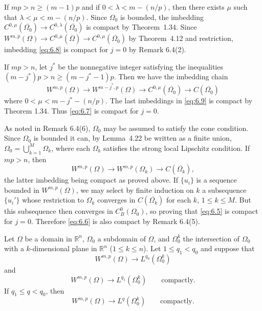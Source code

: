 \begin{para}
  If $mp > n\geq (m-1)p$ and if $0 < \lambda < m-(n/p)$, then there exists $\mu$ such that
  $\lambda < \mu < m-(n/p)$. Since $\Omega_0$ is bounded,
  the imbedding $C^{0,\mu}(\overline{\Omega_0})\to C^{0,\lambda}(\overline{\Omega_0})$ is compact by Theorem~1.34.
  Since $W^{m,p}(\Omega)\to C^{0,\mu}(\overline{\Omega})\to C^{0,\mu}(\overline{\Omega_0})$ by Theorem~4.12
  and restriction, imbedding \eqref{eq:6.8} is compact for $j=0$ by Remark 6.4(2).

  If $mp>n$, let $j^*$ be the nonnegative integer satisfying the inequalities
  $(m-j^*)p > n \geq (m-j^*-1)p$. Then we have the imbedding chain
  \begin{equation}\label{eq:6.9}
    W^{m,p}(\Omega) \to W^{m-j^*,p}(\Omega) \to C^{0,\mu}(\overline{\Omega_0}) \to C(\overline{\Omega_0})
  \end{equation}
  where $0 < \mu < m-j^*-(n/p)$. The last imbeddings in \eqref{eq:6.9} is compact by Theorem 1.34.
  Thus \eqref{eq:6.7} is compact for $j=0$.
\end{para}


\begin{para}
  As noted in Remark 6.4(6), $\Omega_0$ may be assumed to satisfy the cone condition.
  Since $\Omega_0$ is bounded it can, by Lemma~4.22 be written as a finite union,
  $\Omega_0 = \bigcup_{k=1}^M \Omega_k$, where each $\Omega_k$ satisfies the strong local Lipschitz
  condition. If $mp>n$, then
  \[W^{m,p}(\Omega) \to W^{m,p}(\Omega_k) \to C(\overline{\Omega_k}),\]
  the latter imbedding being compact as proved above. If $\{u_i\}$ is a sequence bounded in $W^{m,p}(\Omega)$,
  we may select by finite induction on $k$ a subsequence $\{u_i'\}$ whose restriction to $\Omega_k$
  converges in $C(\overline{\Omega_k})$ for each $k$, $1\leq k\leq M$.
  But this subsequence then converges in $C_B^0(\Omega_0)$, so proving that \eqref{eq:6.5} is compact
  for $j=0$. Therefore \eqref{eq:6.6} is also compact by Remark 6.4(5).
\end{para}


\begin{lemma}\label{lemma:6.7}
  Let $\Omega$ be a domain in $\mathbb{R}^n$, $\Omega_0$ a subdomain of $\Omega$,
  and $\Omega_0^k$ the intersection of $\Omega_0$ with a $k$-dimensional plane in
  $\mathbb{R}^n$ ($1\leq k\leq n$). Let $1\leq q_1<q_0$ and suppose that
  \[ W^{m,p}(\Omega) \to L^{q_0}(\Omega_0^k) \]
  and
  \[ W^{m,p}(\Omega) \to L^{q_1}(\Omega_0^k) \qquad \text{compactly}. \]
  If $q_1\leq q<q_0$, then
  \[ W^{m,p}(\Omega) \to L^q(\Omega_0^k) \qquad \text{compactly}. \]
\end{lemma}

